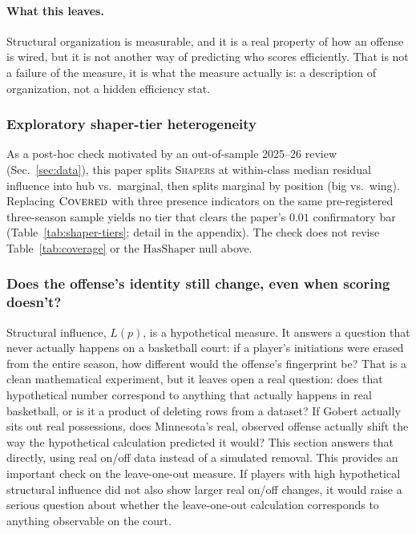 \documentclass[11pt]{article}
\newcommand{\load}{\ensuremath{L}} %
\begin{document}
\paragraph{What this leaves.}
Structural organization is measurable, and it is a real property of how an offense is
wired, but it is not another way of predicting who scores efficiently. That is not a
failure of the measure, it is what the measure actually is: a description of organization,
not a hidden efficiency stat.

\subsubsection{Exploratory shaper-tier heterogeneity}
\label{sec:shaper-tiers-main}
As a post-hoc check motivated by an out-of-sample 2025--26 review (Sec.~\ref{sec:data}),
this paper splits \textsc{Shapers} at within-class median residual influence into hub vs.\
marginal, then splits marginal by position (big vs.\ wing). Replacing $\textsc{Covered}$ with
three presence indicators on the same pre-registered three-season sample yields no tier that
clears the paper's $0.01$ confirmatory bar (Table~\ref{tab:shaper-tiers}; detail in the
appendix). The check does not revise Table~\ref{tab:coverage} or the $\text{HasShaper}$ null
above.

\subsubsection{Does the offense's identity still change, even when scoring doesn't?}
\label{sec:identity-resilience}

Structural influence, $\load(p)$, is a hypothetical measure. It answers a question that
never actually happens on a basketball court: if a player's initiations were erased from
the entire season, how different would the offense's fingerprint be? That is a clean
mathematical experiment, but it leaves open a real question: does that hypothetical number
correspond to anything that actually happens in real basketball, or is it a product of
deleting rows from a dataset? If Gobert actually sits out real possessions, does
Minnesota's real, observed offense actually shift the way the hypothetical calculation
predicted it would? This section answers that directly, using real on/off data instead of a
simulated removal. This provides an important check on the leave-one-out measure. If players
with high hypothetical structural influence did not also show larger real on/off changes, it
would raise a serious question about whether the leave-one-out calculation corresponds to
anything observable on the court.
\end{document}
